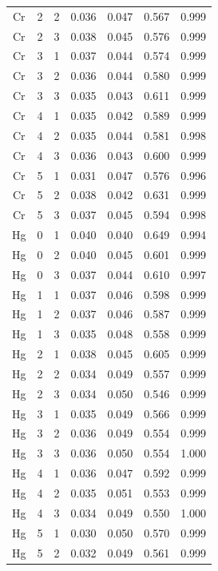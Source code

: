 \documentclass[ms, hidelinks]{uncgdissertationexp3}
\theoremstyle{plain}
\theoremstyle{definition}
\theoremstyle{remark}
\begin{document}
\begin{longtable}{ccccccc}
  Cr & 2 & 2 & 0.036 & 0.047 & 0.567 & 0.999\\
  \rowcolor{gray!6}  Cr & 2 & 3 & 0.038 & 0.045 & 0.576 & 0.999\\
  Cr & 3 & 1 & 0.037 & 0.044 & 0.574 & 0.999\\
  \rowcolor{gray!6}  Cr & 3 & 2 & 0.036 & 0.044 & 0.580 & 0.999\\
  Cr & 3 & 3 & 0.035 & 0.043 & 0.611 & 0.999\\
  \rowcolor{gray!6}  Cr & 4 & 1 & 0.035 & 0.042 & 0.589 & 0.999\\
  Cr & 4 & 2 & 0.035 & 0.044 & 0.581 & 0.998\\
  \rowcolor{gray!6}  Cr & 4 & 3 & 0.036 & 0.043 & 0.600 & 0.999\\
  Cr & 5 & 1 & 0.031 & 0.047 & 0.576 & 0.996\\
  \rowcolor{gray!6}  Cr & 5 & 2 & 0.038 & 0.042 & 0.631 & 0.999\\
  Cr & 5 & 3 & 0.037 & 0.045 & 0.594 & 0.998\\
  \rowcolor{gray!6}  Hg & 0 & 1 & 0.040 & 0.040 & 0.649 & 0.994\\
  Hg & 0 & 2 & 0.040 & 0.045 & 0.601 & 0.999\\
  \rowcolor{gray!6}  Hg & 0 & 3 & 0.037 & 0.044 & 0.610 & 0.997\\
  Hg & 1 & 1 & 0.037 & 0.046 & 0.598 & 0.999\\
  \rowcolor{gray!6}  Hg & 1 & 2 & 0.037 & 0.046 & 0.587 & 0.999\\
  Hg & 1 & 3 & 0.035 & 0.048 & 0.558 & 0.999\\
  \rowcolor{gray!6}  Hg & 2 & 1 & 0.038 & 0.045 & 0.605 & 0.999\\
  Hg & 2 & 2 & 0.034 & 0.049 & 0.557 & 0.999\\
  \rowcolor{gray!6}  Hg & 2 & 3 & 0.034 & 0.050 & 0.546 & 0.999\\
  Hg & 3 & 1 & 0.035 & 0.049 & 0.566 & 0.999\\
  \rowcolor{gray!6}  Hg & 3 & 2 & 0.036 & 0.049 & 0.554 & 0.999\\
  Hg & 3 & 3 & 0.036 & 0.050 & 0.554 & 1.000\\
  \rowcolor{gray!6}  Hg & 4 & 1 & 0.036 & 0.047 & 0.592 & 0.999\\
  Hg & 4 & 2 & 0.035 & 0.051 & 0.553 & 0.999\\
  \rowcolor{gray!6}  Hg & 4 & 3 & 0.034 & 0.049 & 0.550 & 1.000\\
  Hg & 5 & 1 & 0.030 & 0.050 & 0.570 & 0.999\\
  \rowcolor{gray!6}  Hg & 5 & 2 & 0.032 & 0.049 & 0.561 & 0.999\\

\end{longtable}
\end{document}
